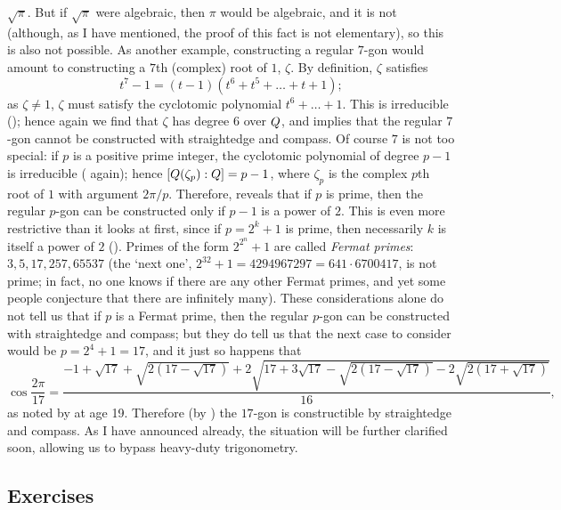 $\sqrt{\pi}$. But if $\sqrt{\pi}$ were algebraic, then $\pi$ would be
algebraic, and it is not (although, as I have mentioned,
the proof of this fact is not elementary), so this is also not
possible.  As another example, constructing a regular $7$-gon would
amount to constructing a $7$th (complex) root of $1$, $\zeta$. By
definition, $\zeta$ satisfies
\[
  t^7 - 1 = (t-1)(t^6 + t^5 + \dots + t + 1);
\]
as $\zeta \neq 1$, $\zeta$ must satisfy the cyclotomic polynomial
$t^6 + \dots + 1$. This is irreducible (); hence
again we find that $\zeta$ has degree $6$ over $Q$, and
 implies that the regular $7$-gon cannot be
constructed with straightedge and compass.  Of course $7$ is not too
special: if $p$ is a positive prime integer, the cyclotomic polynomial
of degree $p-1$ is irreducible ( again); hence
$[Q(\zeta_p) : Q] = p - 1$, where $\zeta_p$ is the complex $p$th
root of $1$ with argument $2\pi/p$. Therefore, 
reveals that if $p$ is prime, then the regular $p$-gon can be
constructed only if $p - 1$ is a power of $2$. This is even more
restrictive than it looks at first, since if $p = 2^k + 1$ is prime,
then necessarily $k$ is itself a power of $2$
(). Primes of the
form $2^{2^n} + 1$ are called \emph{Fermat primes}:
$3, 5, 17, 257, 65537$ (the `next one',
$2^{32} + 1 = 4294967297 = 641 \cdot 6700417$, is not prime; in fact,
no one knows if there are any other Fermat primes, and yet some people
conjecture that there are infinitely many).  These considerations
alone do not tell us that if $p$ is a Fermat prime, then the regular
$p$-gon can be constructed with straightedge and compass; but they do
tell us that the next case to consider would be $p = 2^4 + 1 = 17$,
and it just so happens that
\[
  \cos\frac{2\pi}{17} = \frac{-1 + \sqrt{17} + \sqrt{2(17-\sqrt{17})}
    + 2\sqrt{17 + 3\sqrt{17} - \sqrt{2(17-\sqrt{17})} -
      2\sqrt{2(17+\sqrt{17})}}}{16},
\]
as noted by  at age 19. Therefore (by
) the $17$-gon is constructible by straightedge
and compass. As I have announced already, the situation will be
further clarified soon, allowing us to bypass heavy-duty trigonometry.
\subsection*{Exercises}

